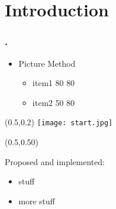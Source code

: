 \documentclass[12pt,t]{beamer}
\begin{document}
\section{Introduction}
\begin{frame}
\frametitle{\thesection.~\insertsection}
\begin{itemize}
\item Picture Method
\begin{itemize}
\item item1 80 80 
\item item2 50 80
\end{itemize}
\end{itemize}

\begin{textblock*}{0.45\textwidth}(0.5\textwidth,0.2\textheight)
\texttt{[image: start.jpg]}
\end{textblock*}

\begin{textblock*}{0.45\textwidth}(0.5\textwidth,0.50\textheight)
\begin{exampleblock}{}
  Proposed and implemented:
  \begin{itemize}
    \item stuff
    \item more stuff
  \end{itemize}
\end{exampleblock}
\end{textblock*}

\end{frame}
\end{document}
